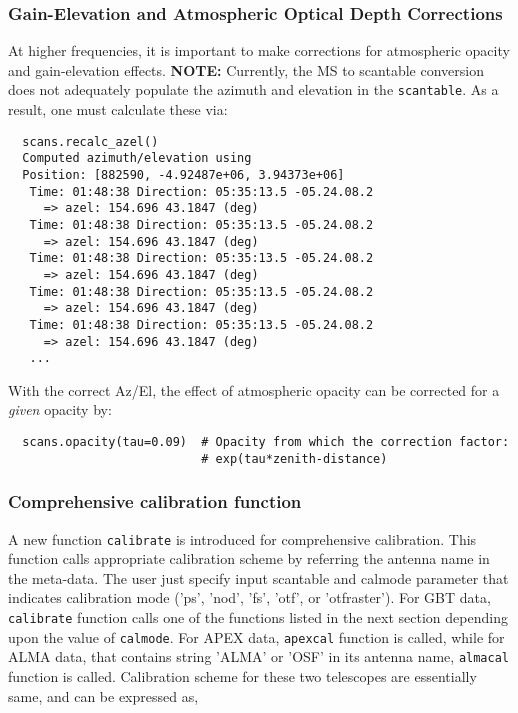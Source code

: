 \subsubsection{Gain-Elevation and Atmospheric Optical Depth Corrections}
\label{subsubsection:sd.asap.calib.gain}

At higher frequencies, it is important to make corrections for
atmospheric opacity and gain-elevation effects. {\bf NOTE:} Currently,
the MS to scantable conversion does not adequately populate the
azimuth and elevation in the {\tt scantable}. As a result, one must
calculate these via:

\small
\begin{verbatim}
  scans.recalc_azel()
  Computed azimuth/elevation using 
  Position: [882590, -4.92487e+06, 3.94373e+06]
   Time: 01:48:38 Direction: 05:35:13.5 -05.24.08.2
     => azel: 154.696 43.1847 (deg)
   Time: 01:48:38 Direction: 05:35:13.5 -05.24.08.2
     => azel: 154.696 43.1847 (deg)
   Time: 01:48:38 Direction: 05:35:13.5 -05.24.08.2
     => azel: 154.696 43.1847 (deg)
   Time: 01:48:38 Direction: 05:35:13.5 -05.24.08.2
     => azel: 154.696 43.1847 (deg)
   Time: 01:48:38 Direction: 05:35:13.5 -05.24.08.2
     => azel: 154.696 43.1847 (deg)
   ...
\end{verbatim}
\normalsize


With the correct Az/El, the effect of atmospheric opacity can be corrected 
for a {\it given} opacity by:

\small
\begin{verbatim}
  scans.opacity(tau=0.09)  # Opacity from which the correction factor: 
                           # exp(tau*zenith-distance)
\end{verbatim}
\normalsize


\subsubsection{Comprehensive calibration function}
A new function {\tt calibrate} is introduced for comprehensive
calibration. This function calls appropriate calibration scheme by
referring the antenna name in the meta-data. The user just specify input
scantable and calmode parameter that indicates calibration mode ('ps',
'nod', 'fs', 'otf', or 'otfraster'). 
For GBT data, {\tt calibrate} function calls one of
the functions listed in the next section depending upon the value of
{\tt calmode}. For APEX data, {\tt apexcal} function is called, while for ALMA
data, that contains string 'ALMA' or 'OSF' in its antenna name, {\tt almacal}
function is called. Calibration scheme for these two telescopes are
essentially same, and can be expressed as,

